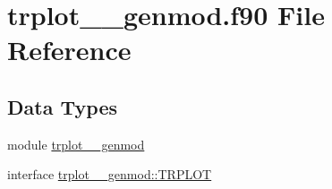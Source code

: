 \hypertarget{trplot____genmod_8f90}{\section{trplot\+\_\+\+\_\+genmod.\+f90 File Reference}
\label{trplot____genmod_8f90}
}
\subsection*{Data Types}
\begin{DoxyCompactItemize}
\item 
module \hyperlink{classtrplot____genmod}{trplot\+\_\+\+\_\+genmod}
\item 
interface \hyperlink{interfacetrplot____genmod_1_1TRPLOT}{trplot\+\_\+\+\_\+genmod\+::\+T\+R\+P\+L\+O\+T}
\end{DoxyCompactItemize}
